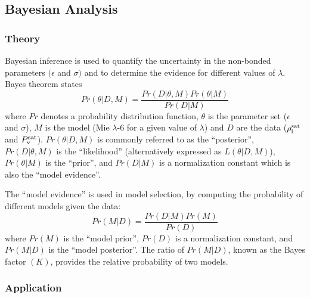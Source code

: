 \documentclass[journal=jctc,manuscript=article]{achemso}
\begin{document}
\subsection{Bayesian Analysis} \label{Bayesian Analysis}

\subsubsection{Theory}

Bayesian inference is used to quantify the uncertainty in the non-bonded parameters $(\epsilon$ and $\sigma)$ and to determine the evidence for different values of $\lambda$. 
Bayes theorem states
\begin{equation} \label{Bayes Theorem}
Pr(\theta|D,M) = \frac{Pr(D|\theta,M)Pr(\theta|M)}{Pr(D|M)}
\end{equation}
where $Pr$ denotes a probability distribution function, $\theta$ is the parameter set ($\epsilon$ and $\sigma$), $M$ is the model (Mie $\lambda$-6 for a given value of $\lambda$) and $D$ are the data ($\rho_{\rm l}^{\rm sat}$ and $P_{\rm v}^{\rm sat}$). $Pr(\theta|D,M)$ is commonly referred to as the ``posterior'', $Pr(D|\theta,M)$ is the ``likelihood'' (alternatively expressed as $L(\theta|D,M)$), $Pr(\theta|M)$ is the ``prior'', and $Pr(D|M)$ is a normalization constant which is also the ``model evidence''. 

The ``model evidence'' is used in model selection, by computing the probability of different models given the data:
\begin{equation} \label{Model Selection}
Pr(M|D) = \frac{Pr(D|M)Pr(M)}{Pr(D)}
\end{equation}
where $Pr(M)$ is the ``model prior'', $Pr(D)$ is a normalization constant, and $Pr(M|D)$ is the ``model posterior''. The ratio of $Pr(M|D)$, known as the Bayes factor $(K)$, provides the relative probability of two models. 

\subsubsection{Application}
\end{document}
